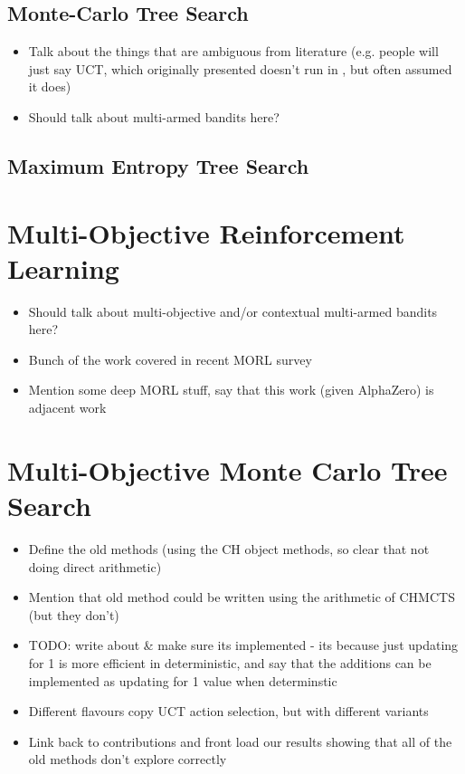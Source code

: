 
    \subsection{Monte-Carlo Tree Search}
    \label{sec:3-2-2-mcts}

        \begin{itemize}
            \item Talk about the things that are ambiguous from literature (e.g. people will just say UCT, which originally presented doesn't run in \mctsmode, but often assumed it does)
            \item Should talk about multi-armed bandits here?
        \end{itemize}
    
    \subsection{Maximum Entropy Tree Search}
    \label{sec:3-2-3-ments}


\section{Multi-Objective Reinforcement Learning}
\label{sec:3-3-morl}

    \begin{itemize}
        \item Should talk about multi-objective and/or contextual multi-armed bandits here?
        \item Bunch of the work covered in recent MORL survey \cite{morl_survey}
        \item Mention some deep MORL stuff, say that this work (given AlphaZero) is adjacent work
    \end{itemize}

\section{Multi-Objective Monte Carlo Tree Search}
\label{sec:3-4-momcts}


    \begin{itemize}
        \item Define the old methods (using the CH object methods, so clear that not doing direct arithmetic)
        \item Mention that old method could be written using the arithmetic of CHMCTS (but they don't) 
        \item TODO: write about \& make sure its implemented - its because just updating for 1 is more efficient in deterministic, and say that the additions can be implemented as updating for 1 value when determinstic
        \item Different flavours copy UCT action selection, but with different variants
        \item Link back to contributions and front load our results showing that all of the old methods don't explore correctly
    \end{itemize}
